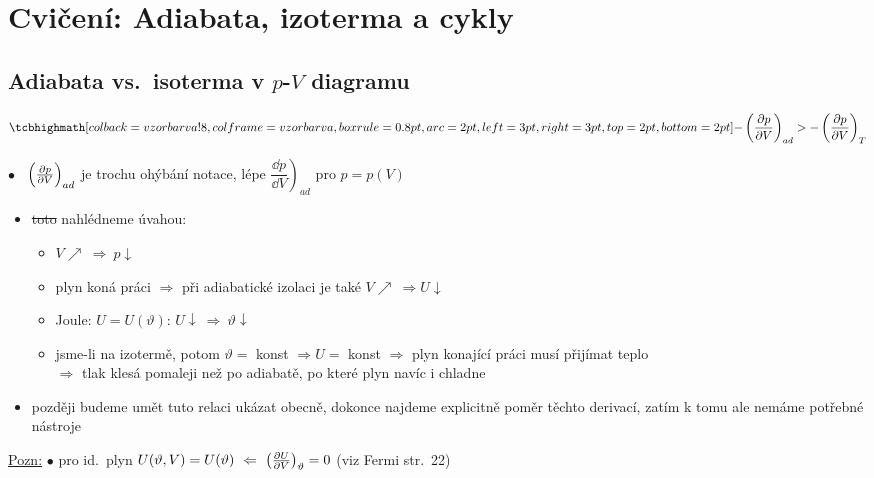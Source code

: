 \providecommand{\dbar}{{\mathchar'26\mkern-12mu d}}

\section{Cvičení: Adiabata, izoterma a cykly}
\subsection*{Adiabata vs.\ isoterma v $p$-$V$ diagramu}

\begin{minipage}{0.4\textwidth}
\[
  \vzorec{-\left(\pdv{p}{V}\right)_{ad} > -\left(\pdv{p}{V}\right)_T}
\]
\end{minipage}
\begin{minipage}{0.58\textwidth}
$\bullet$ \ $\left(\pdv{p}{V}\right)_{ad}$ je trochu ohýbání notace, lépe $\left.\dfrac{\dd p}{\dd V}\right)_{ad}$ pro $p = p(V)$
\end{minipage}

\begin{itemize}[label=--]
  \item \sout{toto} nahlédneme úvahou:
  \begin{itemize}
    \item $V\nearrow \ \Rightarrow\ p\downarrow$
    \item plyn koná práci $\Rightarrow$ při adiabatické izolaci je také $V\nearrow\ \Rightarrow U\downarrow$
    \item Joule: $U = U(\vartheta)$: \quad $U\downarrow\ \Rightarrow\ \vartheta\downarrow$
    \item jsme-li na izotermě, potom $\vartheta = $ konst $\Rightarrow U = $ konst $\Rightarrow$ plyn konající práci musí přijímat teplo \\
    \quad $\Rightarrow$ tlak klesá pomaleji než po adiabatě, po které plyn navíc i chladne
  \end{itemize}
  \item později budeme umět tuto relaci ukázat obecně, dokonce najdeme explicitně poměr těchto derivací, zatím k tomu ale nemáme potřebné nástroje
\end{itemize}

\underline{Pozn:} \quad $\bullet$ pro id.\ plyn \quad $U(\vartheta, V) = U(\vartheta) \ \Leftarrow\ \left(\pdv{U}{V}\right)_\vartheta = 0$
\quad \textcolor{NavyBlue}{(viz Fermi str.\ 22)}

